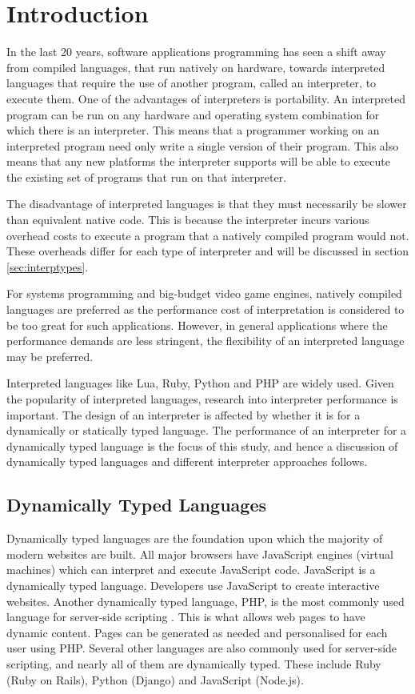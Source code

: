 \documentclass[english,a4paper,12pt]{report}
\begin{document}
\tableofcontents
\newpage{}

\chapter{Introduction}

In the last 20 years, software applications programming has seen a
shift away from compiled languages, that run natively on hardware,
towards interpreted languages that require the use of another program,
called an interpreter, to execute them. One of the advantages of
interpreters is portability. An interpreted program can be run on any
hardware and operating system combination for which there is an
interpreter. This means that a programmer working on an interpreted
program need only write a single version of their program. This also
means that any new platforms the interpreter supports will be able to
execute the existing set of programs that run on that interpreter.

The disadvantage of interpreted languages is that they must
necessarily be slower than equivalent native code. This is because the
interpreter incurs various overhead costs to execute a program that a
natively compiled program would not. These overheads differ for each
type of interpreter and will be discussed in section
\ref{sec:interptypes}. 

For systems programming and big-budget video game engines, natively
compiled languages are preferred as the performance cost of
interpretation is considered to be too great for such
applications. However, in general applications where the performance
demands are less stringent, the flexibility of an interpreted language
may be preferred.

Interpreted languages like Lua, Ruby, Python and PHP are widely
used. Given the popularity of interpreted languages, research into
interpreter performance is important. The design of an interpreter is
affected by whether it is for a dynamically or statically typed
language. The performance of an interpreter for a dynamically typed
language is the focus of this study, and hence a discussion of
dynamically typed languages and different interpreter approaches
follows.

\section{Dynamically Typed Languages}
Dynamically typed languages are the foundation upon which the majority
of modern websites are built. All major browsers have JavaScript
engines (virtual machines) which can interpret and execute JavaScript
code. JavaScript is a dynamically typed language. Developers use
JavaScript to create interactive websites. Another dynamically typed
language, PHP, is the most commonly used language for server-side
scripting \cite{PHP_pop}. This is what allows web pages to have dynamic
content. Pages can be generated as needed and personalised for each
user using PHP. Several other languages are also commonly used for
server-side scripting, and nearly all of them are dynamically
typed. These include Ruby (Ruby on Rails), Python (Django) and
JavaScript (Node.js).
\end{document}
